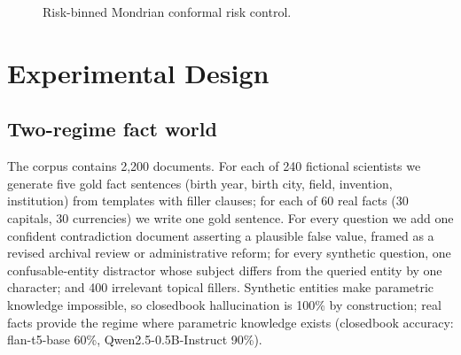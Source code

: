 \documentclass[sn-basic]{sn-jnl}
\theoremstyle{thmstyleone}
\theoremstyle{thmstyletwo}
\begin{document}
\begin{figure}[tbp]
\centering
{}
\caption{Risk-binned Mondrian conformal risk control.}
\label{alg:rb}
\end{figure}

\section{Experimental Design}\label{sec:design}

\subsection{Two-regime fact world}
The corpus contains 2{,}200 documents. For each of 240 fictional
scientists we generate five gold fact sentences (birth year, birth
city, field, invention, institution) from templates with filler
clauses; for each of 60 real facts (30 capitals, 30 currencies) we
write one gold sentence. For every question we add one confident
contradiction document asserting a plausible false value, framed as a
revised archival review or administrative reform; for every synthetic
question, one confusable-entity distractor whose subject differs from
the queried entity by one character; and 400 irrelevant topical
fillers. Synthetic entities make parametric knowledge impossible, so
closedbook hallucination is 100\% by construction; real facts provide
the regime where parametric knowledge exists (closedbook accuracy:
flan-t5-base 60\%, Qwen2.5-0.5B-Instruct 90\%).
\end{document}
